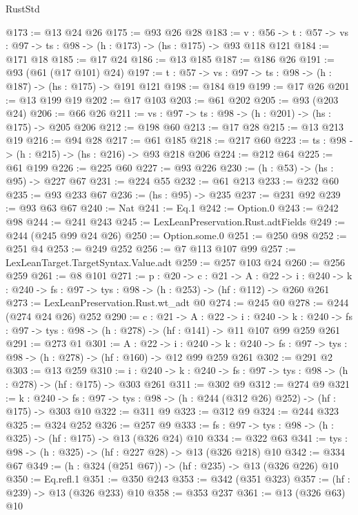 \begin{lexlean}{RustStd}
\begin{coremodule}
@173 := @13 @24 @26
@175 := @93 @26 @28
@183 := {v : @56} ->
  {t : @57} -> {vs : @97} -> {ts : @98} -> (h : @173) -> (hs : @175) -> @93 @118 @121
@184 := @171 @18
@185 := @17 @24
@186 := @13 @185
@187 := @186 @26
@191 := @93 (@61 (@17 @101) @24)
@197 := {t : @57} -> {vs : @97} -> {ts : @98} -> (h : @187) -> (hs : @175) -> @191 @121
@198 := @184 @19
@199 := @17 @26
@201 := @13 @199 @19
@202 := @17 @103
@203 := @61 @202
@205 := @93 (@203 @24)
@206 := @66 @26
@211 := {vs : @97} -> {ts : @98} -> (h : @201) -> (hs : @175) -> @205 @206
@212 := @198 @60
@213 := @17 @28
@215 := @13 @213 @19
@216 := @94 @28
@217 := @61 @185
@218 := @217 @60
@223 := {ts : @98} -> (h : @215) -> (hs : @216) -> @93 @218 @206
@224 := @212 @64
@225 := @61 @199
@226 := @225 @60
@227 := @93 @226
@230 := (h : @53) -> (hs : @95) -> @227 @67
@231 := @224 @55
@232 := @61 @213
@233 := @232 @60
@235 := @93 @233 @67
@236 := (hs : @95) -> @235
@237 := @231 @92
@239 := @93 @63 @67
@240 := Nat
@241 := Eq.{1}
@242 := Option.{0}
@243 := @242 @98
@244 := @241 @243
@245 := LexLeanPreservation.Rust.adtFields
@249 := @244 (@245 @99 @24 @26)
@250 := Option.some.{0}
@251 := @250 @98
@252 := @251 @4
@253 := @249 @252
@256 := @7 @113 @107 @99
@257 := LexLeanTarget.TargetSyntax.Value.adt
@259 := @257 @103 @24
@260 := @256 @259
@261 := @8 @101
@271 := {p : @20} ->
  {c : @21} ->
  {A : @22} ->
  {i : @240} -> {k : @240} -> {fs : @97} -> {tys : @98} -> (h : @253) -> (hf : @112) -> @260 @261
@273 := LexLeanPreservation.Rust.wt_adt @0
@274 := @245 @0
@278 := @244 (@274 @24 @26) @252
@290 := {c : @21} ->
  {A : @22} ->
  {i : @240} ->
  {k : @240} -> {fs : @97} -> {tys : @98} -> (h : @278) -> (hf : @141) -> @11 @107 @99 @259 @261
@291 := @273 @1
@301 := {A : @22} ->
  {i : @240} ->
  {k : @240} -> {fs : @97} -> {tys : @98} -> (h : @278) -> (hf : @160) -> @12 @99 @259 @261
@302 := @291 @2
@303 := @13 @259
@310 := {i : @240} ->
  {k : @240} -> {fs : @97} -> {tys : @98} -> (h : @278) -> (hf : @175) -> @303 @261
@311 := @302 @9
@312 := @274 @9
@321 := {k : @240} ->
  {fs : @97} -> {tys : @98} -> (h : @244 (@312 @26) @252) -> (hf : @175) -> @303 @10
@322 := @311 @9
@323 := @312 @9
@324 := @244 @323
@325 := @324 @252
@326 := @257 @9
@333 := {fs : @97} -> {tys : @98} -> (h : @325) -> (hf : @175) -> @13 (@326 @24) @10
@334 := @322 @63
@341 := {tys : @98} -> (h : @325) -> (hf : @227 @28) -> @13 (@326 @218) @10
@342 := @334 @67
@349 := (h : @324 (@251 @67)) -> (hf : @235) -> @13 (@326 @226) @10
@350 := Eq.refl.{1}
@351 := @350 @243
@353 := @342 (@351 @323)
@357 := (hf : @239) -> @13 (@326 @233) @10
@358 := @353 @237
@361 := @13 (@326 @63) @10

\end{coremodule}
\end{lexlean}
